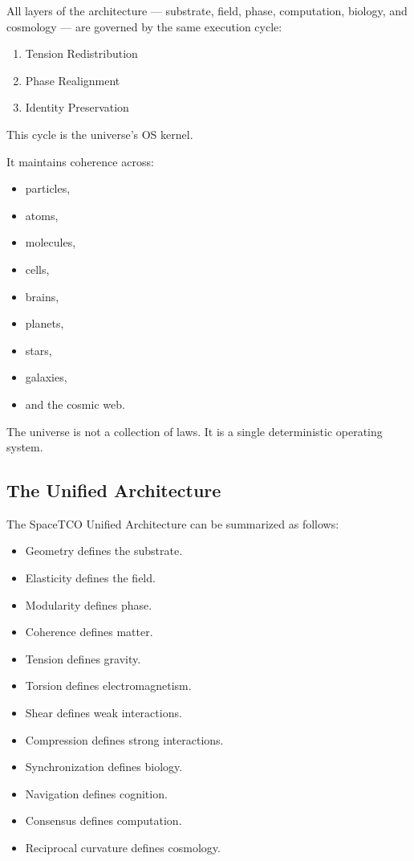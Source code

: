 \documentclass[reprint,amsmath,amssymb,aps,prl,floatfix]{revtex4-2}
\begin{document}
\begin{itemize}
All layers of the architecture — substrate, field, phase, computation, biology, and cosmology — are governed by the same execution cycle:
\begin{enumerate}
\item Tension Redistribution  
\item Phase Realignment  
\item Identity Preservation
\end{enumerate}
\medskip

This cycle is the universe’s OS kernel.
\medskip

It maintains coherence across:
\begin{itemize}
\item particles,  
\item atoms,  
\item molecules,  
\item cells,  
\item brains,  
\item planets,  
\item stars,  
\item galaxies,  
\item and the cosmic web.
\end{itemize}
\medskip

The universe is not a collection of laws.  
It is a single deterministic operating system.

\subsection{The Unified Architecture}

The SpaceTCO Unified Architecture can be summarized as follows:

\begin{itemize}
\item Geometry defines the substrate.  
\item Elasticity defines the field.  
\item Modularity defines phase.  
\item Coherence defines matter.  
\item Tension defines gravity.  
\item Torsion defines electromagnetism.  
\item Shear defines weak interactions.  
\item Compression defines strong interactions.  
\item Synchronization defines biology.  
\item Navigation defines cognition.  
\item Consensus defines computation.  
\item Reciprocal curvature defines cosmology.  
\end{itemize}


\end{itemize}
\end{document}
